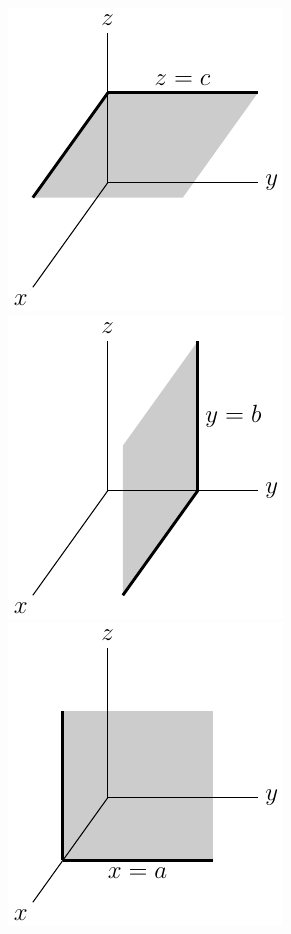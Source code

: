\begin{efig}
\begin{center}
   \includegraphics[scale=0.75]{xyplane}\qquad
   \includegraphics[scale=0.75]{xzplane}\qquad
   \includegraphics[scale=0.75]{yzplane}
\end{center}
\end{efig}
